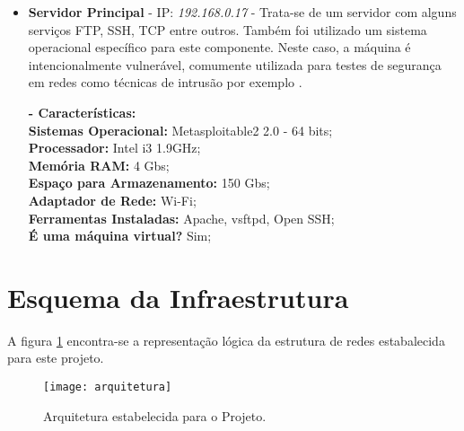 \begin{itemize}
			\textbf{- Características:} \\
			\textbf{Sistemas Operacional:} Security Onion 12.04 - 64 bits; \\
			\textbf{Processador:} Intel i3 1.9GHz; \\
			\textbf{Memória RAM:} 4 Gbs; \\
			\textbf{Espaço para Armazenamento:} 150 Gbs; \\
			\textbf{Adaptador de Rede:} Wi-Fi; \\
			\textbf{Ferramentas Instaladas:} Snort e Snorby; \\
			\textbf{É uma máquina virtual?} Não; \\

			\item \textbf{Servidor Principal} - IP: \emph{192.168.0.17} - Trata-se de um servidor com alguns serviços FTP, SSH, TCP entre outros. Também foi utilizado um sistema operacional específico para este componente. Neste caso, a máquina é intencionalmente vulnerável, comumente utilizada para testes de segurança em redes como técnicas de intrusão por exemplo \cite{metasploitable2}.

			\textbf{- Características:} \\
			\textbf{Sistemas Operacional:} Metasploitable2 2.0 - 64 bits; \\
			\textbf{Processador:} Intel i3 1.9GHz; \\
			\textbf{Memória RAM:} 4 Gbs; \\
			\textbf{Espaço para Armazenamento:} 150 Gbs; \\
			\textbf{Adaptador de Rede:} Wi-Fi; \\
			\textbf{Ferramentas Instaladas:} Apache, vsftpd, Open SSH; \\
			\textbf{É uma máquina virtual?} Sim; \\

		\end{itemize}


	\section{Esquema da Infraestrutura}
	\label{sec:Arquitetura_Esquema_Infra}

		A figura \ref{fig:arquitetura} encontra-se a representação lógica da estrutura de redes estabalecida para este projeto.

		\begin{figure}[h]
			\centering
			\texttt{[image: arquitetura]}
			\caption{Arquitetura estabelecida para o Projeto.}
			\label{fig:arquitetura}
		\end{figure}

